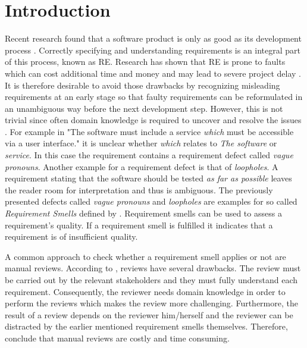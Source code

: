 
\chapter{Introduction}
\label{chp:introduction}

Recent research found that a software product is only as good as its development process \parencite{Hsia:1993}.
Correctly specifying and understanding requirements is an integral part of this process, known as \ac{RE}.
Research has shown that \ac{RE} is prone to faults which can cost additional time and money \parencite{Mendez:2016} and may lead to severe project delay \parencite{Femmer:2014}.
It is therefore desirable to avoid those drawbacks by recognizing misleading requirements at an early stage so that faulty requirements can be reformulated in an unambiguous way before the next development step.
However, this is not trivial since often domain knowledge is required to uncover and resolve the issues \parencite{Femmer:2017}.
For example in "The software must include a service \textit{which} must be accessible via a user interface." it is unclear whether \textit{which} relates to \textit{The software} or \textit{service}.
In this case the requirement contains a requirement defect called \textit{vague pronouns}.
Another example for a requirement defect is that of \textit{loopholes}.
A requirement stating that the software should be tested \textit{as far as possible} leaves the reader room for interpretation and thus is ambiguous.
The previously presented defects called \textit{vague pronouns} and \textit{loopholes} are examples for so called \textit{Requirement Smells} defined by \textcite{Femmer:2017}.
Requirement smells can be used to assess a requirement's quality.
If a requirement smell is fulfilled it indicates that a requirement is of insufficient quality.

A common approach to check whether a requirement smell applies or not are manual reviews.
According to \textcite{Salger:2013}, reviews have several drawbacks.
The review must be carried out by the relevant stakeholders and they must fully understand each requirement.
Consequently, the reviewer needs domain knowledge in order to perform the reviews which makes the review more challenging.
Furthermore, the result of a review depends on the reviewer him/herself \parencite{Zelkowitz:1983} and the reviewer can be distracted by the earlier mentioned requirement smells themselves.
Therefore, \textcite{Femmer:2017} conclude that manual reviews are costly and time consuming.

